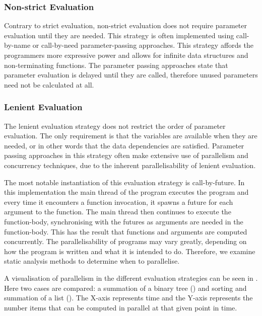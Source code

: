 \subsubsection{Non-strict Evaluation}
Contrary to strict evaluation, non-strict evaluation does not require parameter evaluation until they are needed\cite{hudak1989conception}. This strategy is often implemented using call-by-name or call-by-need parameter-passing approaches. This strategy affords the programmers more expressive power\cite{bird1997more} and allows for infinite data structures and non-terminating functions\cite[p.~103]{huttel2010transitions}. The parameter passing approaches state that parameter evaluation is delayed until they are called, therefore unused parameters need not be calculated at all.

\subsubsection{Lenient Evaluation}
The lenient evaluation strategy does not restrict the order of parameter evaluation. The only requirement is that the variables are available when they are needed, or in other words that the data dependencies are satisfied. Parameter passing approaches in this strategy often make extensive use of parallelism and concurrency techniques, due to the inherent parallelisability of lenient evaluation\cite{DBLP:journals/cl/Tremblay-parallel}.

The most notable instantiation of this evaluation strategy is call-by-future\cite{baker1977incremental}. In this implementation the main thread of the program executes the program and every time it encounters a function invocation, it spawns a future for each argument to the function. The main thread then continues to execute the function-body, synchronising with the futures as arguments are needed in the function-body. This has the result that functions and arguments are computed concurrently. The parallelisability of programs may vary greatly, depending on how the program is written and what it is intended to do. Therefore, we examine static analysis methods to determine when to parallelise.

A visualisation of parallelism in the different evaluation strategies can be seen in . Here two cases are compared: a summation of a binary tree () and sorting and summation of a list (). The X-axis represents time and the Y-axis represents the number items that can be computed in parallel at that given point in time.


